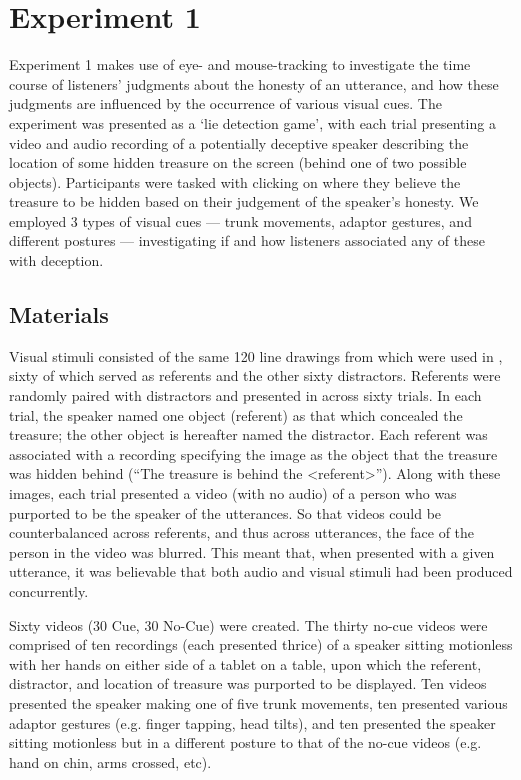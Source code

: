 \documentclass[a4paper,man,natbib]{apa6}
\begin{document}
\section{Experiment 1}
Experiment 1 makes use of eye- and mouse-tracking to investigate the time course of listeners' judgments about the honesty of an utterance, and how these judgments are influenced by the occurrence of various visual cues. 
The experiment was presented as a `lie detection game', with each trial presenting a video and audio recording of a potentially deceptive speaker describing the location of some hidden treasure on the screen (behind one of two possible objects). 
Participants were tasked with clicking on where they believe the treasure to be hidden based on their judgement of the speaker's honesty.
We employed 3 types of visual cues --- trunk movements, adaptor gestures, and different postures --- investigating if and how listeners associated any of these with deception.


\subsection{Materials}
Visual stimuli consisted of the same 120 line drawings from \citet{Snodgrass1980} which were used in \citet{Loy2017}, sixty of which served as referents and the other sixty distractors.
Referents were randomly paired with distractors and presented in across sixty trials. 
In each trial, the speaker named one object (referent) as that which concealed the treasure; the other object is hereafter named the distractor.
Each referent was associated with a recording specifying the image as the object that the treasure was hidden behind (``The treasure is behind the <referent>'').
Along with these images, each trial presented a video (with no audio) of a person who was purported to be the speaker of the utterances. 
So that videos could be counterbalanced across referents, and thus across utterances, the face of the person in the video was blurred. 
This meant that, when presented with a given utterance, it was believable that both audio and visual stimuli had been produced concurrently. 

Sixty videos (30 Cue, 30 No-Cue) were created. 
The thirty no-cue videos were comprised of ten recordings (each presented thrice) of a speaker sitting motionless with her hands on either side of a tablet on a table, upon which the referent, distractor, and location of treasure was purported to be displayed.
Ten videos presented the speaker making one of five trunk movements, ten presented various adaptor gestures (e.g. finger tapping, head tilts), and ten presented the speaker sitting motionless but in a different posture to that of the no-cue videos (e.g. hand on chin, arms crossed, etc).
\end{document}
